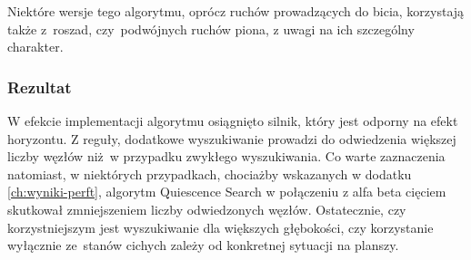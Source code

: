 Niektóre wersje tego algorytmu, oprócz ruchów prowadzących do bicia, korzystają także z~roszad, czy~podwójnych ruchów piona, z uwagi na ich szczególny charakter.

\subsubsection{Rezultat}

W efekcie implementacji algorytmu osiągnięto silnik, który jest odporny na efekt horyzontu.
Z reguły, dodatkowe wyszukiwanie prowadzi do odwiedzenia większej liczby węzłów niż~w przypadku zwykłego wyszukiwania.
Co warte zaznaczenia natomiast, w niektórych przypadkach, chociażby wskazanych w dodatku \ref{ch:wyniki-perft}, algorytm Quiescence Search w połączeniu z alfa beta cięciem skutkował zmniejszeniem liczby odwiedzonych węzłów.
Ostatecznie, czy korzystniejszym jest wyszukiwanie dla większych głębokości, czy korzystanie wyłącznie ze~stanów cichych zależy od konkretnej sytuacji na planszy.